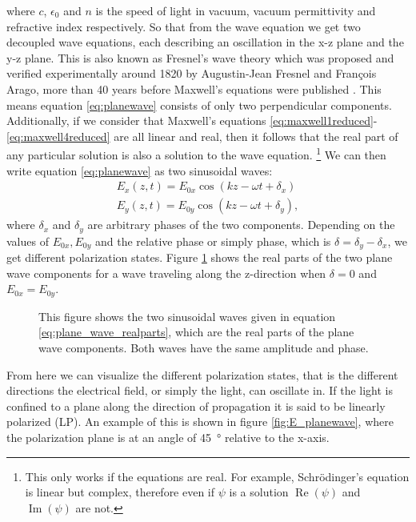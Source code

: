 where $c$, $\epsilon_0$ and $n$ is the speed of light in vacuum, vacuum permittivity and refractive index respectively.
So that from the wave equation we get two decoupled wave equations, each describing an oscillation in the x-z plane and the y-z plane. This is also known as Fresnel's wave theory which was proposed and verified experimentally around 1820 by Augustin-Jean Fresnel and François Arago, more than 40 years before Maxwell's equations were published \cite{Collett2009FieldPolarization,Jackson1998ClassicalEdition}.
This means equation \ref{eq:planewave} consists of only two perpendicular components. Additionally, if we consider that Maxwell's equations \ref{eq:maxwell1reduced}-\ref{eq:maxwell4reduced} are all linear and real, then it follows that the real part of any particular solution is also a solution to the wave equation. \footnote{This only works if the equations are real. For example, Schrödinger's equation is linear but complex, therefore even if $\psi$ is a solution $\operatorname{Re}(\psi)$ and $\operatorname{Im}(\psi)$ are not.} We can then write equation \ref{eq:planewave} as two sinusoidal waves:
\begin{equation}
\label{eq:plane_wave_realparts}
\begin{aligned}
    E_x(z, t) = E_{0x}\cos(kz-\omega t + \delta_x) \\
    E_y(z, t) = E_{0y}\cos(kz-\omega t + \delta_y), 
\end{aligned}
\end{equation}
where $\delta_x$ and $\delta_y$ are arbitrary phases of the two components. Depending on the values of $E_{0x}, E_{0y}$ and the relative phase or simply phase, which is $\delta = \delta_y - \delta_x$, we get different polarization states. Figure \ref{fig:Ex_Ey_planewaves} shows the real parts of the two plane wave components for a wave traveling along the z-direction when $\delta=0$ and $E_{0x}=E_{0y}$.

\begin{figure}[h]
    \centering
    
    \caption{This figure shows the two sinusoidal waves given in equation \ref{eq:plane_wave_realparts}, which are the real parts of the plane wave components. Both waves have the same amplitude and phase.}
    \label{fig:Ex_Ey_planewaves}
\end{figure}

From here we can visualize the different polarization states, that is the different directions the electrical field, or simply the light, can oscillate in. If the light is confined to a plane along the direction of propagation it is said to be linearly polarized (LP). An example of this is shown in figure \ref{fig:E_planewave}, where the polarization plane is at an angle of \SI{45}{\degree} relative to the x-axis. 

